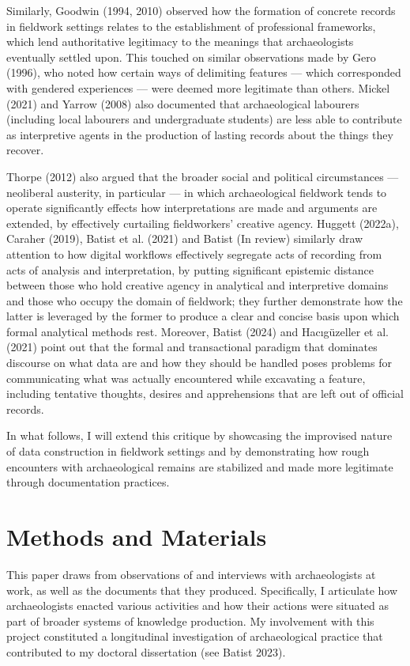 \documentclass[
]{article}
\begin{document}
Similarly, Goodwin (1994, 2010) observed how the formation of concrete
records in fieldwork settings relates to the establishment of
professional frameworks, which lend authoritative legitimacy to the
meanings that archaeologists eventually settled upon. This touched on
similar observations made by Gero (1996), who noted how certain ways of
delimiting features --- which corresponded with gendered experiences ---
were deemed more legitimate than others. Mickel (2021) and Yarrow (2008)
also documented that archaeological labourers (including local labourers
and undergraduate students) are less able to contribute as interpretive
agents in the production of lasting records about the things they
recover.

Thorpe (2012) also argued that the broader social and political
circumstances --- neoliberal austerity, in particular --- in which
archaeological fieldwork tends to operate significantly effects how
interpretations are made and arguments are extended, by effectively
curtailing fieldworkers' creative agency. Huggett (2022a), Caraher
(2019), Batist et al. (2021) and Batist (In review) similarly draw
attention to how digital workflows effectively segregate acts of
recording from acts of analysis and interpretation, by putting
significant epistemic distance between those who hold creative agency in
analytical and interpretive domains and those who occupy the domain of
fieldwork; they further demonstrate how the latter is leveraged by the
former to produce a clear and concise basis upon which formal analytical
methods rest. Moreover, Batist (2024) and Hacıgüzeller et al. (2021)
point out that the formal and transactional paradigm that dominates
discourse on what data are and how they should be handled poses problems
for communicating what was actually encountered while excavating a
feature, including tentative thoughts, desires and apprehensions that
are left out of official records.

In what follows, I will extend this critique by showcasing the
improvised nature of data construction in fieldwork settings and by
demonstrating how rough encounters with archaeological remains are
stabilized and made more legitimate through documentation practices.

\section{Methods and Materials}\label{methods-and-materials}

This paper draws from observations of and interviews with archaeologists
at work, as well as the documents that they produced. Specifically, I
articulate how archaeologists enacted various activities and how their
actions were situated as part of broader systems of knowledge
production. My involvement with this project constituted a longitudinal
investigation of archaeological practice that contributed to my doctoral
dissertation (see Batist 2023).
\end{document}
